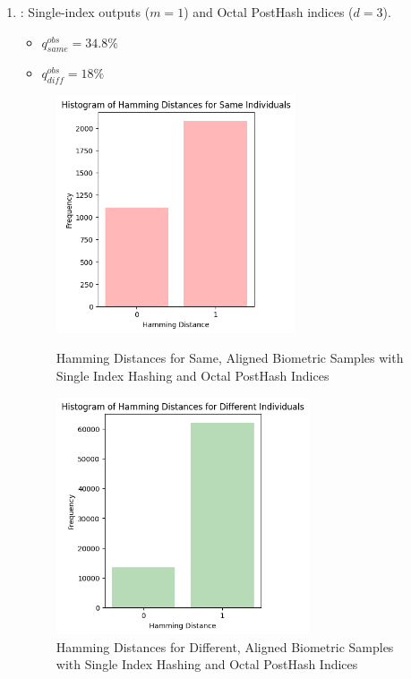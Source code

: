 \begin{enumerate}
    \item {}: Single-index outputs (\(m=1\)) and Octal PostHash indices (\(d=3\)).
    \begin{itemize}
        \item \(q_{same}^{obs} = 34.8\%\)
        \item \(q_{diff}^{obs} = 18\%\)
    \end{itemize}

    \begin{figure}[H]
        \centering
        \begin{minipage}[b]{0.48\linewidth}
            \centering
            \includegraphics[width=\linewidth,height=7cm,keepaspectratio]{latex-img/d3same.png}
            \caption{Hamming Distances for Same, Aligned Biometric Samples with Single Index Hashing and Octal PostHash Indices}
            \label{mu_same}
        \end{minipage}
        \hfill
        \begin{minipage}[b]{0.48\linewidth}
            \centering
            \includegraphics[width=\linewidth,height=7cm,keepaspectratio]{latex-img/d3diff.png}
            \caption{Hamming Distances for Different, Aligned Biometric Samples with Single Index Hashing and Octal PostHash Indices}
            \label{mu_diff}
        \end{minipage}
    \end{figure}
    

\end{enumerate}
